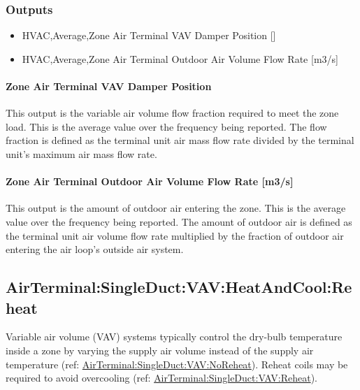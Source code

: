 \subsubsection{Outputs}\label{outputs-3}

\begin{itemize}
\item
  HVAC,Average,Zone Air Terminal VAV Damper Position {[]}
\item
  HVAC,Average,Zone Air Terminal Outdoor Air Volume Flow Rate {[}m3/s{]}
\end{itemize}

\paragraph{Zone Air Terminal VAV Damper Position}\label{zone-air-terminal-vav-damper-position-1}

This output is the variable air volume flow fraction required to meet the zone load. This is the average value over the frequency being reported. The flow fraction is defined as the terminal unit air mass flow rate divided by the terminal unit's maximum air mass flow rate.

\paragraph{Zone Air Terminal Outdoor Air Volume Flow Rate {[}m3/s{]}}

This output is the amount of outdoor air entering the zone. This is the average value over the frequency being reported. The amount of outdoor air is defined as the terminal unit air volume flow rate multiplied by the fraction of outdoor air entering the air loop's outside air system.

\subsection{AirTerminal:SingleDuct:VAV:HeatAndCool:Reheat}\label{airterminalsingleductvavheatandcoolreheat}

Variable air volume (VAV) systems typically control the dry-bulb temperature inside a zone by varying the supply air volume instead of the supply air temperature (ref: \hyperref[airterminalsingleductvavnoreheat]{AirTerminal:SingleDuct:VAV:NoReheat}). Reheat coils may be required to avoid overcooling (ref: \hyperref[airterminalsingleductvavreheat]{AirTerminal:SingleDuct:VAV:Reheat}).

